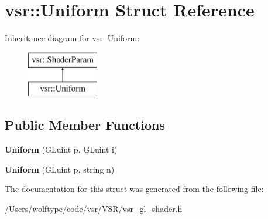 \hypertarget{structvsr_1_1_uniform}{\section{vsr\-:\-:Uniform Struct Reference}
\label{structvsr_1_1_uniform}
}
Inheritance diagram for vsr\-:\-:Uniform\-:\begin{figure}[H]
\begin{center}
\leavevmode
\includegraphics[height=2.000000cm]{structvsr_1_1_uniform}
\end{center}
\end{figure}
\subsection*{Public Member Functions}
\begin{DoxyCompactItemize}
\item 
\hypertarget{structvsr_1_1_uniform_ac04ad21548c63176ada0dd98966e81c8}{{\bfseries Uniform} (G\-Luint p, G\-Luint i)}\label{structvsr_1_1_uniform_ac04ad21548c63176ada0dd98966e81c8}

\item 
\hypertarget{structvsr_1_1_uniform_a4409b78419e22a4e9a2ff90b32e495d7}{{\bfseries Uniform} (G\-Luint p, string n)}\label{structvsr_1_1_uniform_a4409b78419e22a4e9a2ff90b32e495d7}

\end{DoxyCompactItemize}


The documentation for this struct was generated from the following file\-:\begin{DoxyCompactItemize}
\item 
/\-Users/wolftype/code/vsr/\-V\-S\-R/vsr\-\_\-gl\-\_\-shader.\-h\end{DoxyCompactItemize}
